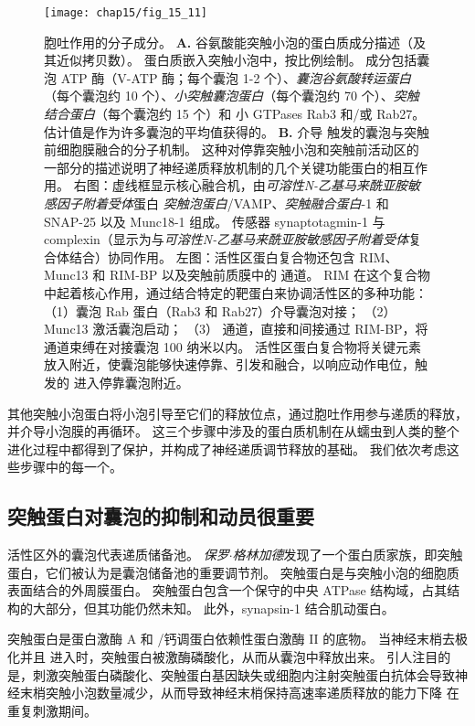 \begin{figure}[htbp]
	\centering
	\texttt{[image: chap15/fig\_15\_11]}
	\caption{胞吐作用的分子成分。
		\textbf{A.} 谷氨酸能突触小泡的蛋白质成分描述（及其近似拷贝数）。
		蛋白质嵌入突触小泡中，按比例绘制。
		成分包括囊泡 ATP 酶（V-ATP 酶；每个囊泡 1-2 个）、\textit{囊泡谷氨酸转运蛋白}（每个囊泡约 10 个）、\textit{小突触囊泡蛋白}（每个囊泡约 70 个）、\textit{突触结合蛋白}（每个囊泡约 15 个）和 小 GTPases Rab3 和/或 Rab27。
		估计值是作为许多囊泡的平均值获得的\cite{takamori2006molecular}。
		\textbf{B.} 介导  触发的囊泡与突触前细胞膜融合的分子机制。
		这种对停靠突触小泡和突触前活动区的一部分的描述说明了神经递质释放机制的几个关键功能蛋白的相互作用。
		右图：虚线框显示核心融合机，由\textit{可溶性N-乙基马来酰亚胺敏感因子附着受体}蛋白 \textit{突触泡蛋白}/VAMP、\textit{突触融合蛋白}-1 和 SNAP-25 以及 Munc18-1 组成。
		 传感器 synaptotagmin-1 与 complexin（显示为与\textit{可溶性N-乙基马来酰亚胺敏感因子附着受体}复合体结合）协同作用。
		左图：活性区蛋白复合物还包含 RIM、Munc13 和 RIM-BP 以及突触前质膜中的  通道。
		RIM 在这个复合物中起着核心作用，通过结合特定的靶蛋白来协调活性区的多种功能：
		（1）囊泡 Rab 蛋白（Rab3 和 Rab27）介导囊泡对接；
		（2）Munc13 激活囊泡启动；
		（3） 通道，直接和间接通过 RIM-BP，将  通道束缚在对接囊泡 100 纳米以内。
		活性区蛋白复合物将关键元素放入附近，使囊泡能够快速停靠、引发和融合，以响应动作电位，触发的 进入停靠囊泡附近\cite{sudhof2013neurotransmitter}。}
	\label{fig:15_11}
\end{figure}


其他突触小泡蛋白将小泡引导至它们的释放位点，通过胞吐作用参与递质的释放，并介导小泡膜的再循环。
这三个步骤中涉及的蛋白质机制在从蠕虫到人类的整个进化过程中都得到了保护，并构成了神经递质调节释放的基础。
我们依次考虑这些步骤中的每一个。



\subsection{突触蛋白对囊泡的抑制和动员很重要}

活性区外的囊泡代表递质储备池。
\textit{保罗$\cdot$格林加德}发现了一个蛋白质家族，即突触蛋白，它们被认为是囊泡储备池的重要调节剂。
突触蛋白是与突触小泡的细胞质表面结合的外周膜蛋白。
突触蛋白包含一个保守的中央 ATPase 结构域，占其结构的大部分，但其功能仍然未知。
此外，synapsin-1 结合肌动蛋白。


突触蛋白是蛋白激酶 A 和 /钙调蛋白依赖性蛋白激酶 II 的底物。
当神经末梢去极化并且  进入时，突触蛋白被激酶磷酸化，从而从囊泡中释放出来。
引人注目的是，刺激突触蛋白磷酸化、突触蛋白基因缺失或细胞内注射突触蛋白抗体会导致神经末梢突触小泡数量减少，从而导致神经末梢保持高速率递质释放的能力下降 在重复刺激期间。



